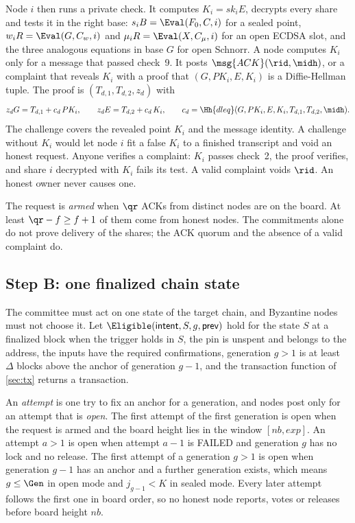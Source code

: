 Node $i$ then runs a private check. It computes $K_i = sk_i E$, decrypts every share and tests it in the right base: $s_i B = \Eval(F_0, C, i)$ for a sealed point, $w_i R = \Eval(G, C_w, i)$ and $\mu_i R = \Eval(X, C_\mu, i)$ for an open ECDSA slot, and the three analogous equations in base $G$ for open Schnorr. A node computes $K_i$ only for a message that passed check~9. It posts $\msg{ACK}(\rid, \midh)$, or a complaint that reveals $K_i$ with a proof that $(G, PK_i, E, K_i)$ is a Diffie-Hellman tuple. The proof is $(T_{d,1}, T_{d,2}, z_d)$ with
\[
  z_d G = T_{d,1} + c_d\,PK_i, \qquad z_d E = T_{d,2} + c_d\,K_i, \qquad c_d = \Hh{dleq}(G, PK_i, E, K_i, T_{d,1}, T_{d,2}, \midh).
\]
The challenge covers the revealed point $K_i$ and the message identity. A challenge without $K_i$ would let node $i$ fit a false $K_i$ to a finished transcript and void an honest request. Anyone verifies a complaint: $K_i$ passes check~2, the proof verifies, and share $i$ decrypted with $K_i$ fails its test. A valid complaint voids $\rid$. An honest owner never causes one.

The request is \emph{armed} when $\qr$ ACKs from distinct nodes are on the board. At least $\qr - f \ge f+1$ of them come from honest nodes. The commitments alone do not prove delivery of the shares; the ACK quorum and the absence of a valid complaint do.

\subsection{Step B: one finalized chain state}\label{sec:anchor}

The committee must act on one state of the target chain, and Byzantine nodes must not choose it. Let $\Eligible(\textsf{intent}, S, g, \textsf{prev})$ hold for the state $S$ at a finalized block when the trigger holds in $S$, the pin is unspent and belongs to the address, the inputs have the required confirmations, generation $g > 1$ is at least $\Delta$ blocks above the anchor of generation $g-1$, and the transaction function of \cref{sec:tx} returns a transaction.

An \emph{attempt} is one try to fix an anchor for a generation, and nodes post only for an attempt that is \emph{open}. The first attempt of the first generation is open when the request is armed and the board height lies in the window $[nb, exp]$. An attempt $a > 1$ is open when attempt $a-1$ is \textsf{FAILED} and generation $g$ has no lock and no release. The first attempt of a generation $g > 1$ is open when generation $g-1$ has an anchor and a further generation exists, which means $g \le \Gen$ in open mode and $j_{g-1} < K$ in sealed mode. Every later attempt follows the first one in board order, so no honest node reports, votes or releases before board height $nb$.

